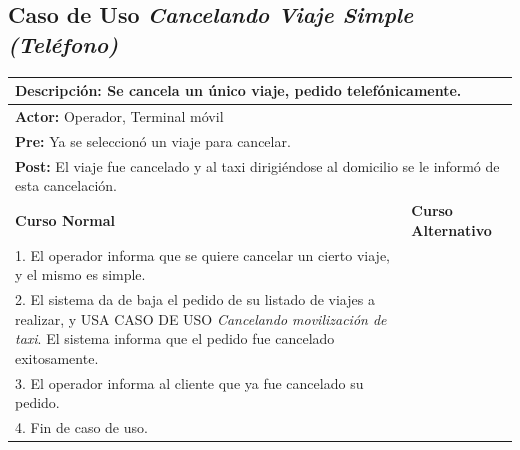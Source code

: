 \documentclass[a4paper]{article}
\begin{document}
\subsection{Caso de Uso \textit{Cancelando Viaje Simple (Tel\'efono)}}
\begin{center}
\begin{tabular}{|p{10cm} | p{6cm}|}
\hline
\multicolumn{2}{|p{16cm}|}{\textbf{Descripci\'on:} Se cancela un \'unico viaje, pedido telef\'onicamente. } \\
\hline
\multicolumn{2}{|l|}{\textbf{Actor:} Operador, Terminal m\'ovil} \\
\hline
\multicolumn{2}{|l|}{\textbf{Pre:} Ya se seleccion\'o un viaje para cancelar.} \\
\hline
\multicolumn{2}{|p{16cm}|}{\textbf{Post:} El viaje fue cancelado y al taxi dirigi\'endose al domicilio se le inform\'o de esta cancelaci\'on.}\\
\hline
\textbf{Curso Normal}  & \textbf{Curso Alternativo} \\ \hline
1. El operador informa que se quiere cancelar un cierto viaje, y el mismo es simple. & \\ \hline
2. El sistema da de baja el pedido de su listado de viajes a realizar, y USA CASO DE USO \textit{Cancelando movilizaci\'on de taxi}. El sistema informa que el pedido fue cancelado exitosamente. & \\ \hline
3. El operador informa al cliente que ya fue cancelado su pedido. & \\ \hline
4. Fin de caso de uso. & \\ \hline
\end{tabular}
\end{center}
\end{document}
